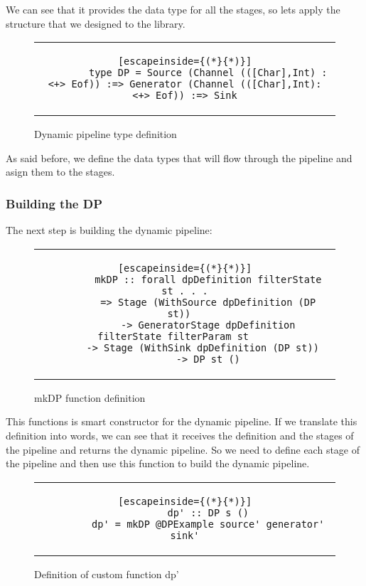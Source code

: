 We can see that it provides the data type for all the stages, so lets apply the structure that we designed to the library. 

\begin{figure}[H]
    \centering
    \begin{tabular}{c}
        \begin{lstlisting}[escapeinside={(*}{*)}]
        type DP = Source (Channel (([Char],Int) :<+> Eof)) :=> Generator (Channel (([Char],Int):<+> Eof)) :=> Sink
        \end{lstlisting}
    \end{tabular}
    \caption{Dynamic pipeline type definition}
    \label{fig:DP11}
\end{figure}

As said before, we define the data types that will flow through the pipeline and asign them to the stages. 

\subsubsection{Building the DP}
The next step is building the dynamic pipeline:

\begin{figure}[H]
    \centering
    \begin{tabular}{c}
        \begin{lstlisting}[escapeinside={(*}{*)}]
        mkDP :: forall dpDefinition filterState st . . .
        => Stage (WithSource dpDefinition (DP st))	
        -> GeneratorStage dpDefinition filterState filterParam st	 
        -> Stage (WithSink dpDefinition (DP st))	
        -> DP st ()
        \end{lstlisting}
    \end{tabular}
    \caption{mkDP function definition}
    \label{fig:DP12}
\end{figure}

This functions is smart constructor for the dynamic pipeline. 
If we translate this definition into words, we can see that it receives the definition and the stages of the pipeline and returns the dynamic pipeline.
So we need to define each stage of the pipeline and then use this function to build the dynamic pipeline.

\begin{figure}[H]
    \centering
    \begin{tabular}{c}
        \begin{lstlisting}[escapeinside={(*}{*)}]
        dp' :: DP s ()
        dp' = mkDP @DPExample source' generator' sink'
        \end{lstlisting}
    \end{tabular}
    \caption{Definition of custom function dp'}
    \label{fig:DP13}
\end{figure}

